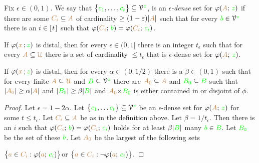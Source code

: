 \documentclass[creche.tex]{subfiles}
\begin{document}
\begin{definition}
Fix $\epsilon\in (0,1)$. We say that $\big\{{\color{green} c_1},\dots,{\color{green} c_t}\big\}\subseteq\EuScript V^{\color{green} z}$, is an \emph{$\epsilon$-dense\/} set for $\varphi({\color{brown} A};\,{\color{green} z})$ if there are some ${\color{brown} C_i}\subseteq{\color{brown}A}$ of cardinality $\ge(1-\varepsilon)|{\color{brown} A}|$ such that for every ${\color{green} b}\in\EuScript V^{\color{green} z}$ there is an $i\in[\kern1pt t\kern1pt]$ such that $\varphi({\color{brown} C_i};\,{\color{green} b})=\varphi({\color{brown} C_i};\,{\color{green} c_i})$.\QED
\end{definition}


\begin{theorem} If $\varphi({\color{brown} x}\,;{\color{green} z})$ is distal, then for every $\epsilon\in (0,1]$ there is an integer $t_\epsilon$ such that for every ${\color{brown} A}\subseteq{\color{brown}\EuScript U}$ there is a set of cardinality $\le t_\epsilon$ that is $\epsilon$-dense set for $\varphi({\color{brown} A};\,{\color{green} z})$.
\end{theorem}

\begin{corollary} If $\varphi({\color{brown} x}\,;{\color{green} z})$ is distal, then for every $\alpha\in(0,1/2)$ there is a $\beta\in(0,1)$ such that for every finite ${\color{brown} A}\subseteq{\color{brown}\EuScript U}$ and ${\color{green} B}\subseteq\EuScript V^{\color{green} z}$ there are ${\color{brown} A_0}\subseteq{\color{brown}A}$ and ${\color{green} B_0}\subseteq{\color{green}B}$ such that $|{\color{brown} A_0}|\ge\alpha|{\color{brown} A}|$ and $|{\color{green} B_0}|\ge\beta|{\color{green} B}|$ and ${\color{brown} A_0}{\times}{\color{green} B_0}$ is either contained in or disjoint of $\phi$.
\end{corollary}

\begin{proof}
Let $\epsilon=1-2\alpha$. Let $\big\{{\color{green} c_1},\dots{\color{green}c_t}\big\}\subseteq\EuScript V^{\color{green} z}$ be an $\epsilon$-dense set for $\varphi({\color{brown} A};\,{\color{green} z})$ for some $t\le t_\epsilon$. Let ${\color{brown} C_i}\subseteq{\color{brown}A}$ be as in the definition above. Let $\beta=1/t_\epsilon$. Then there is an $i$ such that $\varphi({\color{brown} C_i};\,{\color{green} b})=\varphi({\color{brown} C_i};\,{\color{green} c_i})$ holds for at least
 $\beta|{\color{green} B}|$ many ${\color{green} b}\in{\color{green}B}$. Let ${\color{green} B_0}$ be the set of these ${\color{green} b}$. Let ${\color{brown} A_0}$ be the largest of the following sets

\hfill$\big\{{\color{brown} a}\in{\color{brown}C_i} : \varphi({\color{brown} a};\,{\color{green} c_i})\big\}$\hfill or \hfill  $\big\{{\color{brown} a}\in{\color{brown}C_i} : \neg\varphi({\color{brown} a};\,{\color{green} c_i})\big\}$.
\end{proof}
\end{document}
